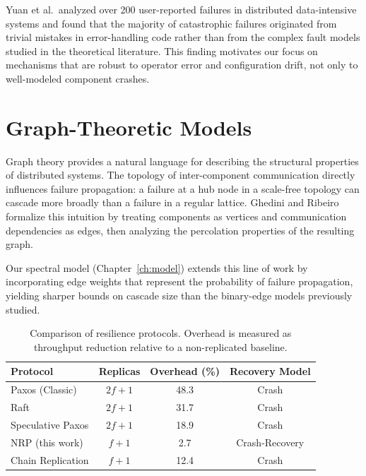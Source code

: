 \documentclass[12pt,letterpaper,oneside]{report}
\begin{document}
Yuan et al.\ analyzed over 200 user-reported failures in distributed data-intensive systems and found that the majority of catastrophic failures originated from trivial mistakes in error-handling code rather than from the complex fault models studied in the theoretical literature. This finding motivates our focus on mechanisms that are robust to operator error and configuration drift, not only to well-modeled component crashes.

\section{Graph-Theoretic Models}

Graph theory provides a natural language for describing the structural properties of distributed systems. The topology of inter-component communication directly influences failure propagation: a failure at a hub node in a scale-free topology can cascade more broadly than a failure in a regular lattice. Ghedini and Ribeiro \cite{ghedini2011} formalize this intuition by treating components as vertices and communication dependencies as edges, then analyzing the percolation properties of the resulting graph.

Our spectral model (Chapter~\ref{ch:model}) extends this line of work by incorporating edge weights that represent the probability of failure propagation, yielding sharper bounds on cascade size than the binary-edge models previously studied.

\begin{table}[htbp]
\centering
\caption{Comparison of resilience protocols. Overhead is measured as throughput reduction relative to a non-replicated baseline.}
\label{tab:comparison}
\begin{tabular}{@{}lccc@{}}
\toprule
\textbf{Protocol} & \textbf{Replicas} & \textbf{Overhead (\%)} & \textbf{Recovery Model} \\
\midrule
Paxos (Classic)            & $2f+1$ & 48.3  & Crash           \\{}
Raft                       & $2f+1$ & 31.7  & Crash           \\{}
Speculative Paxos          & $2f+1$ & 18.9  & Crash           \\{}
NRP (this work)            & $f+1$  & 2.7   & Crash-Recovery  \\{}
Chain Replication          & $f+1$  & 12.4  & Crash           \\
\bottomrule
\end{tabular}
\end{table}
\end{document}
